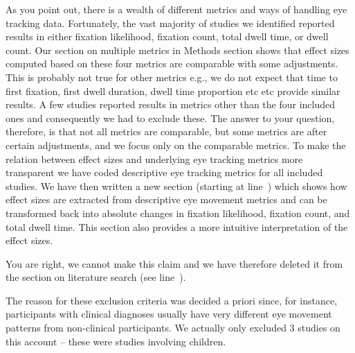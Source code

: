 As you point out, there is a wealth of different metrics and ways of handling eye tracking data. Fortunately, the vast majority of studies we identified reported results in either fixation likelihood, fixation count, total dwell time, or dwell count. Our section on multiple metrics in Methods section shows that effect sizes computed based on these four metrics are comparable with some adjustments. This is probably not true for other metrics e.g., we do not expect that time to first fixation, first dwell duration, dwell time proportion etc etc provide similar results. A few studies reported results in metrics other than the four included ones and consequently we had to exclude these. The answer to your question, therefore, is that not all metrics are comparable, but some metrics are after certain adjustments, and we focus only on the comparable metrics. To make the relation between effect sizes and underlying eye tracking metrics more transparent we have coded descriptive eye tracking metrics for all included studies. We have then written a new section (starting at line~) which shows how effect sizes are extracted from descriptive eye movement metrics and can be transformed back into absolute changes in fixation likelihood, fixation count, and total dwell time. This section also provides a more intuitive interpretation of the effect sizes. 



You are right, we cannot make this claim and we have therefore deleted it from the section on literature search (see line~). 



The reason for these exclusion criteria was decided a priori since, for instance, participants with clinical diagnoses usually have very different eye movement patterns from non-clinical participants. We actually only excluded 3 studies on this account -- these were studies involving children.


